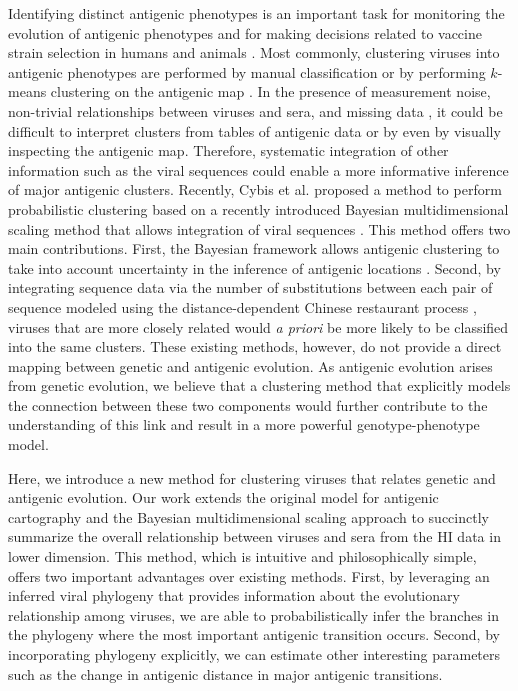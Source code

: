 \documentclass[11pt,oneside,letterpaper]{article}
\begin{document}
Identifying distinct antigenic phenotypes is an important task for monitoring the evolution of antigenic phenotypes and for making decisions related to vaccine strain selection in humans and animals \cite{smith_mapping_2004, fouchier_use_2010}.
Most commonly, clustering viruses into antigenic phenotypes are performed by manual classification or by performing $k$-means clustering on the antigenic map \cite{smith_mapping_2004}. 
In the presence of measurement noise, non-trivial relationships between viruses and sera, and missing data \cite{cai_computational_2010}, it could be difficult to interpret clusters from tables of antigenic data or by even by visually inspecting the antigenic map. 
Therefore, systematic integration of other information such as the viral sequences could enable a more informative inference of major antigenic clusters.
Recently, Cybis et al. \cite{cybis_bayesian_2015} proposed a method to perform probabilistic clustering based on a recently introduced Bayesian multidimensional scaling method \cite{oh_bayesian_2001} that allows integration of viral sequences \cite{bedford_integrating_2014}. 
This method offers two main contributions. 
First, the Bayesian framework allows antigenic clustering to take into account uncertainty in the inference of antigenic locations \cite{bedford_integrating_2014}.
Second, by integrating sequence data via the number of substitutions between each pair of sequence modeled using the distance-dependent Chinese restaurant process \cite{blei_distance_2011}, viruses that are more closely related would \textit{a priori} be more likely to be classified into the same clusters. 
These existing methods, however, do not provide a direct mapping between genetic and antigenic evolution. 
As antigenic evolution arises from genetic evolution, we believe that a clustering method that explicitly models the connection between these two components would further contribute to the understanding of this link and result in a more powerful genotype-phenotype model.

Here, we introduce a new method for clustering viruses that relates genetic and antigenic evolution. 
Our work extends the original model for antigenic cartography \cite{smith_mapping_2004} and the Bayesian multidimensional scaling approach \cite{bedford_integrating_2014} to succinctly summarize the overall relationship between viruses and sera from the HI data in lower dimension.
This method, which is intuitive and philosophically simple, offers two important advantages over existing methods. 
First, by leveraging an inferred viral phylogeny that provides information about the evolutionary relationship among viruses, we are able to probabilistically infer the branches in the phylogeny where the most important antigenic transition occurs. 
Second, by incorporating phylogeny explicitly, we can estimate other interesting parameters such as the change in antigenic distance in major antigenic transitions. 
\end{document}
